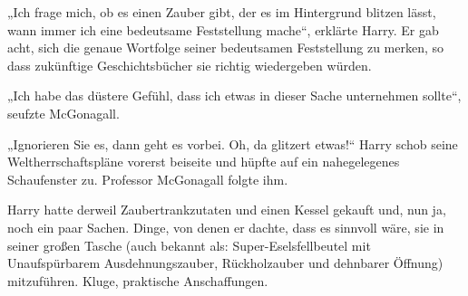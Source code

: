„Ich frage mich, ob es einen Zauber gibt, der es im Hintergrund blitzen lässt, wann immer ich eine bedeutsame Feststellung mache“, erklärte Harry. Er gab acht, sich die genaue Wortfolge seiner bedeutsamen Feststellung zu merken, so dass zukünftige Geschichtsbücher sie richtig wiedergeben würden.

„Ich habe das düstere Gefühl, dass ich etwas in dieser Sache unternehmen sollte“, seufzte McGonagall.

„Ignorieren Sie es, dann geht es vorbei. Oh, da glitzert etwas!“ Harry schob seine Weltherrschaftspläne vorerst beiseite und hüpfte auf ein nahegelegenes Schaufenster zu. Professor McGonagall folgte ihm.

\later

Harry hatte derweil Zaubertrankzutaten und einen Kessel gekauft und, nun ja, noch ein paar Sachen. Dinge, von denen er dachte, dass es sinnvoll wäre, sie in seiner großen Tasche (auch bekannt als: Super-Eselsfellbeutel  mit Unaufspürbarem Ausdehnungszauber, Rückholzauber und dehnbarer Öffnung) mitzuführen. Kluge, praktische Anschaffungen.

